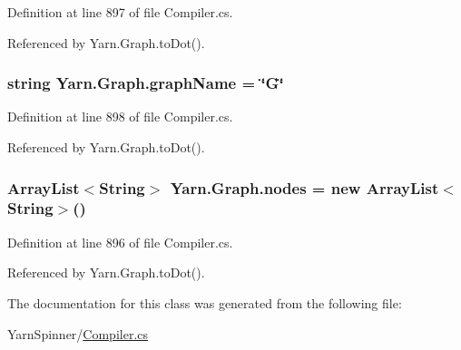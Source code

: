 Definition at line 897 of file Compiler.\-cs.



Referenced by Yarn.\-Graph.\-to\-Dot().

\hypertarget{a00105_a8605f1ec5a4e9cfd07d3ac2be042dac6}{
\subsubsection[{graph\-Name}]{\setlength{\rightskip}{0pt plus 5cm}string Yarn.\-Graph.\-graph\-Name = \char`\"{}G\char`\"{}}}\label{a00105_a8605f1ec5a4e9cfd07d3ac2be042dac6}


Definition at line 898 of file Compiler.\-cs.



Referenced by Yarn.\-Graph.\-to\-Dot().

\hypertarget{a00105_a506df6f737a41748c01239bdea5d82b1}{
\subsubsection[{nodes}]{\setlength{\rightskip}{0pt plus 5cm}Array\-List$<${\bf String}$>$ Yarn.\-Graph.\-nodes = new Array\-List$<${\bf String}$>$()}}\label{a00105_a506df6f737a41748c01239bdea5d82b1}


Definition at line 896 of file Compiler.\-cs.



Referenced by Yarn.\-Graph.\-to\-Dot().



The documentation for this class was generated from the following file\-:\begin{DoxyCompactItemize}
\item 
Yarn\-Spinner/\hyperlink{a00284}{Compiler.\-cs}\end{DoxyCompactItemize}
